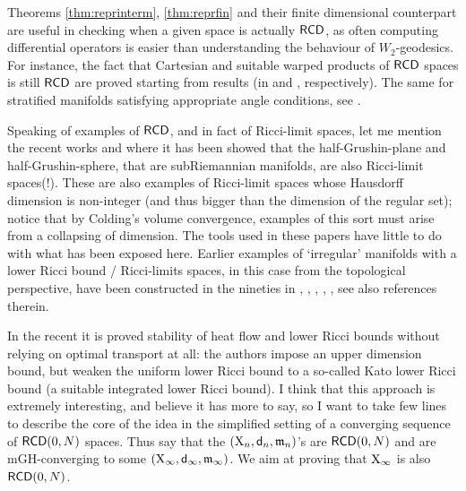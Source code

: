 \documentclass[11pt]{article}
\numberwithin{equation}{section}
\newcommand{\X}{{\rm X}}
\newcommand{\sfd}{{\sf d}}
\newcommand{\mm}{{\mathfrak m}}
\newcommand{\RCD}{{\sf RCD}}
\begin{document}
{{Theorems  \ref{thm:reprinterm}, \ref{thm:reprfin} and their finite dimensional counterpart are useful in checking when a given space is actually $\RCD$, as often computing differential operators is easier than understanding the behaviour of $W_2$-geodesics. For instance, the fact that Cartesian and suitable warped products of $\RCD$ spaces is still $\RCD$ are proved starting from results (in \cite{AmbrosioGigliSavare12} and \cite{Ketterer13}, respectively). The same for  stratified manifolds satisfying appropriate angle conditions, see   \cite{BKMR21}.


Speaking of examples of $\RCD$, and in fact of Ricci-limit spaces, let me mention the recent works  \cite{PanWei22} and \cite{Pan23} where it has been showed that the half-Grushin-plane and half-Grushin-sphere, that are subRiemannian manifolds, are also Ricci-limit spaces(!). These are also examples of Ricci-limit spaces whose Hausdorff dimension is non-integer (and thus bigger than the dimension of the regular set); notice that by Colding's volume convergence, examples of this sort must arise from a collapsing of dimension. The tools used in these papers have little to do with what has been exposed here. Earlier examples of `irregular' manifolds with a lower Ricci bound / Ricci-limits  spaces, in this case from the topological perspective, have been constructed in the  nineties in \cite{ShaYang89}, \cite{AndKroLeB89}, \cite{anderson1990}, \cite{Perelman97}, \cite{Menguy00}, see also references therein.




\medskip



In the recent \cite{CMTkatoI} it is proved stability of heat flow and lower Ricci bounds without relying on optimal transport at all: the authors impose an upper dimension bound, but weaken the uniform lower Ricci bound to a  so-called Kato lower Ricci bound (a suitable integrated lower Ricci bound). I think that this approach is extremely interesting, and believe it has more to say, so I  want to take few lines to describe the core of the idea in the simplified setting of a converging sequence of $\RCD(0,N)$ spaces. Thus say that the $(\X_n,\sfd_n,\mm_n)$'s are $\RCD(0,N)$ and are mGH-converging to some $(\X_\infty,\sfd_\infty,\mm_\infty)$. We aim at proving that $\X_\infty$ is also $\RCD(0,N)$. 

}}
\end{document}
